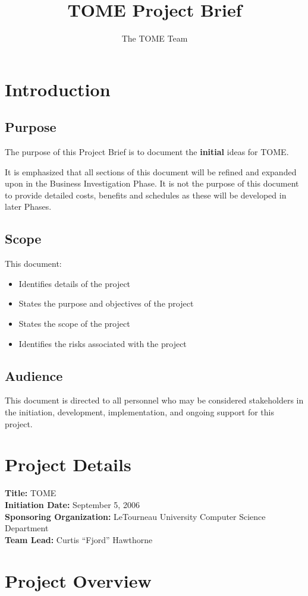\documentclass[12pt,titlepage]{article}
\author{The TOME Team}
\title{\textbf{TOME Project Brief}}
\begin{document}
\maketitle
\tableofcontents
\newpage
\section{Introduction}
\subsection{Purpose}
The purpose of this Project Brief is to document the \textbf{initial} ideas for TOME.

It is emphasized that all sections of this document will be refined and expanded upon in the Business Investigation Phase.  It is not the purpose of this document to provide detailed costs, benefits and schedules as these will be developed in later Phases.

\subsection{Scope}
This document:
\begin{itemize}
	\item Identifies details of the project
	\item States the purpose and objectives of the project
	\item States the scope of the project
	\item Identifies the risks associated with the project
\end{itemize}
\subsection{Audience}
This document is directed to all personnel who may be considered stakeholders in the initiation, development, implementation, and ongoing support for this project.
\section{Project Details}
\textbf{Title:} TOME\\
\textbf{Initiation Date:} September 5, 2006\\
\textbf{Sponsoring Organization:} LeTourneau University Computer Science Department\\
\textbf{Team Lead:} Curtis ``Fjord'' Hawthorne
\section{Project Overview}
\end{document}
